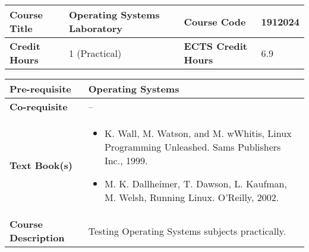 \documentclass[12pt]{article}
\begin{document}
\begin{minipage}{\textwidth}
\begin{tabularx}{\textwidth}{|l|X|l|X|}
\hline
\textbf{Course Title}       &  Operating Systems Laboratory  & \textbf{Course Code}       & 1912024  \\ \hline
\textbf{Credit Hours}       &  1 (Practical) & \textbf{ECTS Credit Hours}       &   6.9 \\ \hline
\end{tabularx}

\begin{tabularx}{\textwidth}{|l|X|}
\hline
\textbf{Pre-requisite}      &  Operating Systems \\ \hline
\textbf{Co-requisite}       &  -- \\ \hline
\textbf{Text Book(s)}      & \begin{minipage}{.70\textwidth}
					\begin{itemize} \itemsep-0.4em
						\vspace{3mm}
						\item K. Wall, M. Watson, and M. wWhitis, Linux Programming Unleashed. Sams Publishers Inc., 1999.
						\item M. K. Dallheimer, T. Dawson, L. Kaufman, M. Welsh, Running Linux. O'Reilly, 2002.
						\vspace{3mm}
					\end{itemize}
				\end{minipage}  \\ \hline
\textbf{Course Description} & \begin{minipage}{.70\textwidth}
					\vspace{3mm}
					Testing Operating Systems subjects practically.

					\vspace{3mm}
					\end{minipage} \\ \hline
\end{tabularx}
\end{minipage}


\bigskip
\bigskip
\end{document}
